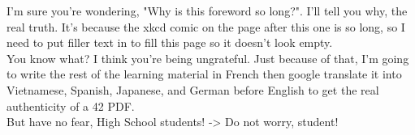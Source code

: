 \documentclass{42-en}
\begin{document}
	I'm sure you're wondering, "Why is this foreword so long?". I'll tell you why, the real truth. 
	It's because the xkcd comic on the page after this one is so long, so I need to put filler 
	text in to fill this page so it doesn't look empty. \\

	You know what? I think you're being ungrateful. Just because of that, I'm going to write 
	the rest of the learning material in French then google translate it into Vietnamese, 
	Spanish, Japanese, and German before English to get the real authenticity of a 42 PDF. \\ 

	But have no fear, High School students! -> Do not worry, student!

    
\end{document}
